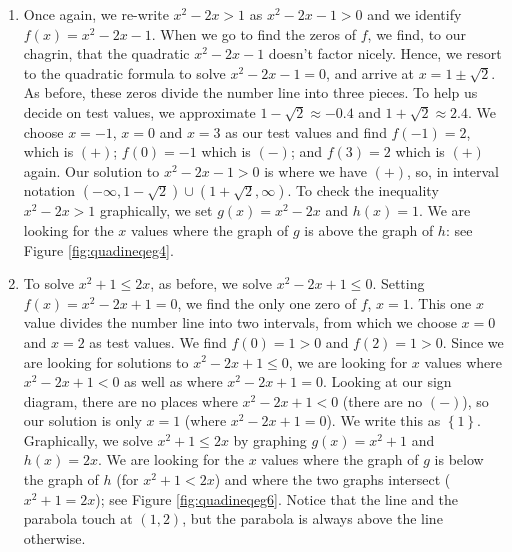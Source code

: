 {\begin{enumerate}

\smallskip


To verify our solution graphically, we refer to the original inequality, $2x^2 \leq 3-x$.  We let $g(x) = 2x^2$ and $h(x)=3-x$.  We are looking for the $x$ values where the graph of $g$ is below that of $h$ (the solution to $g(x) < h(x)$) as well as the points of intersection (the solutions to $g(x)=h(x)$).  See Figure \ref{fig:quadineqeg2}.

\item Once again, we re-write  $x^2-2x > 1$ as $x^2-2x-1>0$ and we identify $f(x)=x^2-2x-1$.  When we go to find the zeros of $f$, we find, to our chagrin, that the quadratic $x^2-2x-1$ doesn't factor nicely.  Hence, we resort to  the quadratic formula to solve $x^2-2x-1=0$, and arrive at $x=1 \pm \sqrt{2}$.  As before, these zeros divide the number line into three pieces.  To help us decide on test values, we approximate $1 - \sqrt{2} \approx -0.4$ and $1 + \sqrt{2} \approx 2.4$.  We choose $x=-1$, $x=0$ and $x=3$ as our test values and find $f(-1)= 2$, which is $(+)$; $f(0)=-1$ which is $(-)$; and $f(3)=2$ which is $(+)$ again.  Our solution to $x^2-2x-1>0$ is where we have $(+)$, so, in interval notation $\left(-\infty, 1-\sqrt{2}\right) \cup \left(1+\sqrt{2},\infty\right)$.  To check the inequality $x^2 - 2x > 1$ graphically, we set $g(x) = x^2-2x$ and $h(x)=1$.  We are looking for the $x$ values where the graph of $g$ is above the graph of $h$: see Figure \ref{fig:quadineqeg4}.


\item  To solve  $x^2+1 \leq 2x$, as before, we solve  $x^2-2x+1 \leq 0$.  Setting $f(x) = x^2-2x+1=0$, we find the only one zero of $f$, $x = 1$.  This one $x$ value divides the number line into two intervals, from which we choose $x=0$ and $x=2$ as test values.  We find $f(0)=1 > 0$ and $f(2) = 1 > 0$.  Since we are looking for solutions to $x^2-2x+1 \leq 0$, we are looking for $x$ values where $x^2-2x+1 < 0$ as well as where $x^2-2x+1 = 0$.  Looking at our sign diagram, there are no places where $x^2-2x+1 < 0$ (there are no $(-)$), so our solution is only $x=1$ (where $x^2-2x+1 = 0$).  We write this as $\left\{1\right\}$.  Graphically, we solve $x^2+1 \leq 2x$ by graphing $g(x) = x^2+1$ and $h(x)=2x$. We are looking for the $x$ values where the graph of $g$ is below the graph of $h$ (for $x^2+1 < 2x$) and where the two graphs intersect ($x^2+1 = 2x$); see Figure \ref{fig:quadineqeg6}.  Notice that the line and the parabola touch at $\left(1, 2\right)$, but the parabola is always above the line otherwise.


\end{enumerate}}
